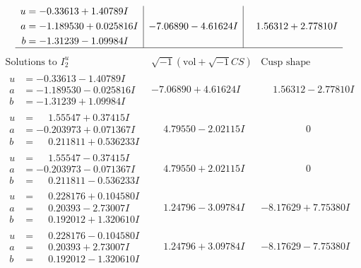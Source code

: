 \documentclass[1p]{elsarticle_modified}
\theoremstyle{definition}
\newcommand{\I}{\sqrt{-1}}
\begin{document}
$$\begin{array}{c|c|c}
\begin{aligned}
u &= -0.33613 + 1.40789 I \\
a &= -1.189530 + 0.025816 I \\
b &= -1.31239 - 1.09984 I\end{aligned}
 & -7.06890 - 4.61624 I & \phantom{-}1.56312 + 2.77810 I\\
 \hline 
 \end{array}$$\newpage$$\begin{array}{c|c|c}  
\text{Solutions to }I^u_{2}& \I (\text{vol} + \sqrt{-1}CS) & \text{Cusp shape}\\
 \hline 
\begin{aligned}
u &= -0.33613 - 1.40789 I \\
a &= -1.189530 - 0.025816 I \\
b &= -1.31239 + 1.09984 I\end{aligned}
 & -7.06890 + 4.61624 I & \phantom{-}1.56312 - 2.77810 I \\ \hline\begin{aligned}
u &= \phantom{-}1.55547 + 0.37415 I \\
a &= -0.203973 + 0.071367 I \\
b &= \phantom{-}0.211811 + 0.536233 I\end{aligned}
 & \phantom{-}4.79550 - 2.02115 I & \phantom{-0.000000 } 0 \\ \hline\begin{aligned}
u &= \phantom{-}1.55547 - 0.37415 I \\
a &= -0.203973 - 0.071367 I \\
b &= \phantom{-}0.211811 - 0.536233 I\end{aligned}
 & \phantom{-}4.79550 + 2.02115 I & \phantom{-0.000000 } 0 \\ \hline\begin{aligned}
u &= \phantom{-}0.228176 + 0.104580 I \\
a &= \phantom{-}0.20393 - 2.73007 I \\
b &= \phantom{-}0.192012 + 1.320610 I\end{aligned}
 & \phantom{-}1.24796 - 3.09784 I & -8.17629 + 7.75380 I \\ \hline\begin{aligned}
u &= \phantom{-}0.228176 - 0.104580 I \\
a &= \phantom{-}0.20393 + 2.73007 I \\
b &= \phantom{-}0.192012 - 1.320610 I\end{aligned}
 & \phantom{-}1.24796 + 3.09784 I & -8.17629 - 7.75380 I \\ \hline\begin{aligned}

\end{aligned}
\end{array}$$
\end{document}
